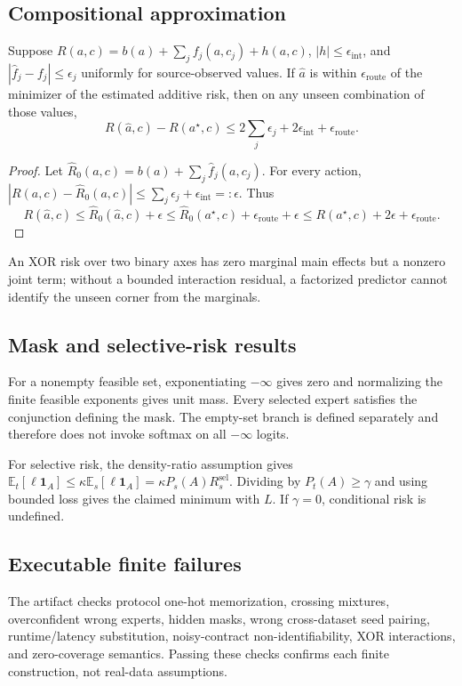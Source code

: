 \subsection{Compositional approximation}
\begin{theorem}
Suppose \(R(a,c)=b(a)+\sum_jf_j(a,c_j)+h(a,c)\), \(|h|\leq\epsilon_{\mathrm{int}}\), and \(|\hat f_j-f_j|\leq\epsilon_j\) uniformly for source-observed values. If \(\hat a\) is within \(\epsilon_{\mathrm{route}}\) of the minimizer of the estimated additive risk, then on any unseen combination of those values,
\[
R(\hat a,c)-R(a^\star,c)\leq 2\sum_j\epsilon_j+2\epsilon_{\mathrm{int}}+\epsilon_{\mathrm{route}}.
\]
\end{theorem}
\begin{proof}
Let \(\hat R_0(a,c)=b(a)+\sum_j\hat f_j(a,c_j)\). For every action, \(|R(a,c)-\hat R_0(a,c)|\leq\sum_j\epsilon_j+\epsilon_{\mathrm{int}}=:\epsilon\). Thus
\[
R(\hat a,c)\leq\hat R_0(\hat a,c)+\epsilon
\leq\hat R_0(a^\star,c)+\epsilon_{\mathrm{route}}+\epsilon
\leq R(a^\star,c)+2\epsilon+\epsilon_{\mathrm{route}}.
\]
\end{proof}
An XOR risk over two binary axes has zero marginal main effects but a nonzero joint term; without a bounded interaction residual, a factorized predictor cannot identify the unseen corner from the marginals.

\subsection{Mask and selective-risk results}
For a nonempty feasible set, exponentiating \(-\infty\) gives zero and normalizing the finite feasible exponents gives unit mass. Every selected expert satisfies the conjunction defining the mask. The empty-set branch is defined separately and therefore does not invoke softmax on all \(-\infty\) logits.

For selective risk, the density-ratio assumption gives
\(\mathbb E_t[\ell\mathbf 1_A]\leq\kappa\mathbb E_s[\ell\mathbf 1_A]=\kappa P_s(A)R_s^{\mathrm{sel}}\).
Dividing by \(P_t(A)\geq\gamma\) and using bounded loss gives the claimed minimum with \(L\). If \(\gamma=0\), conditional risk is undefined.

\subsection{Executable finite failures}
The artifact checks protocol one-hot memorization, crossing mixtures, overconfident wrong experts, hidden masks, wrong cross-dataset seed pairing, runtime/latency substitution, noisy-contract non-identifiability, XOR interactions, and zero-coverage semantics. Passing these checks confirms each finite construction, not real-data assumptions.
